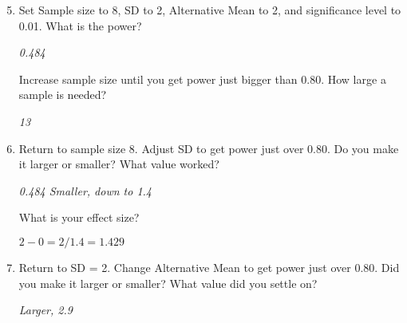 \begin{enumerate}
  \setcounter{enumi}{4}
  \item  Set Sample size to 8, SD to 2, Alternative Mean to 2, and
    significance level to 0.01. What is the power?
\begin{students}
 \vspace{1cm} %
\end{students}

\begin{key}
  {\it 0.484 }
\end{key}

  

    Increase sample size until you get power just bigger than 0.80.
    How large a sample is needed?
\begin{students}
\vspace{1cm} %
\end{students}

\begin{key}
  {\it 13 }
\end{key}


  \item  \label{ss8a}  Return to sample size 8. Adjust SD to get power just over
    0.80. Do you make it larger or smaller?  What value worked? 
\begin{students}
 \vspace{1cm} %
\end{students}

\begin{key}
  {\it 0.484  Smaller, down to 1.4}
\end{key}



    What is your effect size?
\begin{students}
\vspace{1cm} %
\end{students}

\begin{key}
  {\it $2 - 0 = 2/1.4 = 1.429$}
\end{key}

  \item \label{ss8b}  Return to SD = 2.  Change Alternative Mean to get power just
    over 0.80.  Did you make it larger or smaller?  What value did you
    settle on?
\begin{students}
 \vspace{1cm} %
\end{students}

\begin{key}
  {\it Larger, 2.9 }
\end{key}



\end{enumerate}
